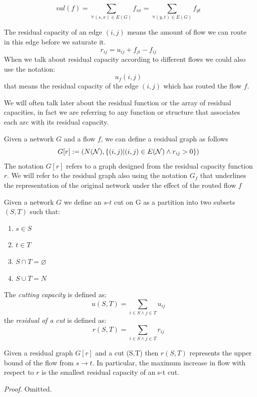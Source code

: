 \[val(f) = \sum_{\forall (s,x) \in E(G)} f_{sx} = \sum_{\forall (y,t) \in E(G)} f_{yt}\]
\begin{definition}
    The residual capacity of an edge $(i,j)$ means the amount of flow we can route in this edge before we saturate it.
    \[r_{ij} = u_{ij} + f_{ji} - f_{ij}\]    
    When we talk about residual capacity according to different flows we could also use the notation:    \[u_f(i,j)\]
    that means the residual capacity of the edge $(i,j)$ which has routed the flow $f$.

\end{definition}
We will often talk later about the residual function or the array of residual capacities, in fact we are referring to any function or structure that associates each arc with its residual capacity.

\begin{definition}
    Given a network $G$ and a flow $f$, we can define a residual graph as follows
    \[G[r] := (N(\mathcal{N}), \{(i,j) | (i,j)\in E(\mathcal{N}) \land r_{ij} > 0\})\]
    The notation $G[r]$ refers to a graph designed from the residual capacity function $r$. We will refer to the residual graph also using the notation $G_f$ that underlines the representation of the original network under the effect of the routed flow $f$
\end{definition}

\begin{definition}[s-t Cut]
    Given a network $G$ we define an $s$-$t$ cut on G as a partition into two subsets $(S, T)$ such that:
    \begin{enumerate}
        \item $s \in S$
        \item $t \in T$
        \item $S \cap T = \varnothing$
        \item $S \cup T = N$
    \end{enumerate}
    
    The \textit{cutting capacity} is defined as:
    \[u(S,T) = \sum_{i\in S\land j\in T} u_{ij}\]
    the \textit{residual of a cut} is defined as:
    \[r(S,T) = \sum_{i\in S\land j\in T} r_{ij}\]
\end{definition}

\begin{lemma}
    \label{maxFlowMinCut}
    Given a residual graph $G[r]$ and a cut (S,T) then $r(S,T)$ represents the upper bound of the flow from $s \rightarrow t$.
In particular, the maximum increase in flow with respect to $r$ is the smallest residual capacity of an s-t cut.
\end{lemma}
\textit{Proof. }Omitted.\\

